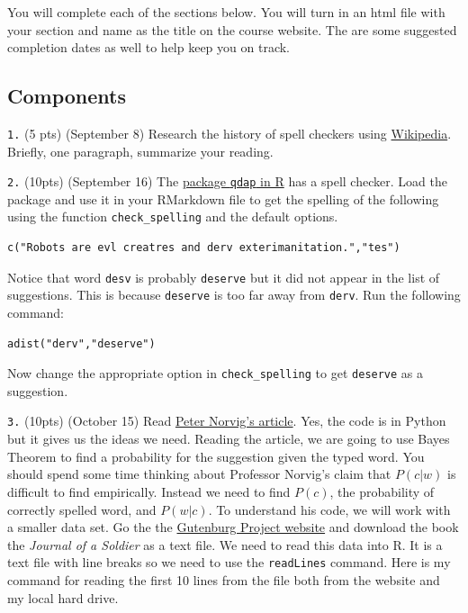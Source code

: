 \documentclass[]{book}
\theoremstyle{definition}
\theoremstyle{definition}
\theoremstyle{definition}
\theoremstyle{remark}
\begin{document}
You will complete each of the sections below. You will turn in an html
file with your section and name as the title on the course website. The
are some suggested completion dates as well to help keep you on track.

\subsection{Components}\label{components}

\texttt{1.} (5 pts) (September 8) Research the history of spell checkers
using \href{http://en.wikipedia.org/wiki/Spell_checker}{Wikipedia}.
Briefly, one paragraph, summarize your reading.

\texttt{2.} (10pts) (September 16) The
\href{https://trinkerrstuff.wordpress.com/2014/09/04/spell-checker-for-r-qdapcheck_spelling/}{package
\texttt{qdap} in R} has a spell checker. Load the package and use it in
your RMarkdown file to get the spelling of the following using the
function \texttt{check\_spelling} and the default options.

\begin{verbatim}
c("Robots are evl creatres and derv exterimanitation.","tes")
\end{verbatim}

Notice that word \texttt{desv} is probably \texttt{deserve} but it did
not appear in the list of suggestions. This is because \texttt{deserve}
is too far away from \texttt{derv}. Run the following command:

\begin{verbatim}
adist("derv","deserve")
\end{verbatim}

Now change the appropriate option in \texttt{check\_spelling} to get
\texttt{deserve} as a suggestion.

\texttt{3.} (10pts) (October 15) Read
\href{http://www.norvig.com/spell-correct.html}{Peter Norvig's article}.
Yes, the code is in Python but it gives us the ideas we need. Reading
the article, we are going to use Bayes Theorem to find a probability for
the suggestion given the typed word. You should spend some time thinking
about Professor Norvig's claim that \(P(c|w)\) is difficult to find
empirically. Instead we need to find \(P(c)\), the probability of
correctly spelled word, and \(P(w|c)\). To understand his code, we will
work with a smaller data set. Go the the
\href{http://www.gutenberg.org/ebooks/49163}{Gutenburg Project website}
and download the book the \emph{Journal of a Soldier} as a text file. We
need to read this data into R. It is a text file with line breaks so we
need to use the \texttt{readLines} command. Here is my command for
reading the first 10 lines from the file both from the website and my
local hard drive.
\end{document}
